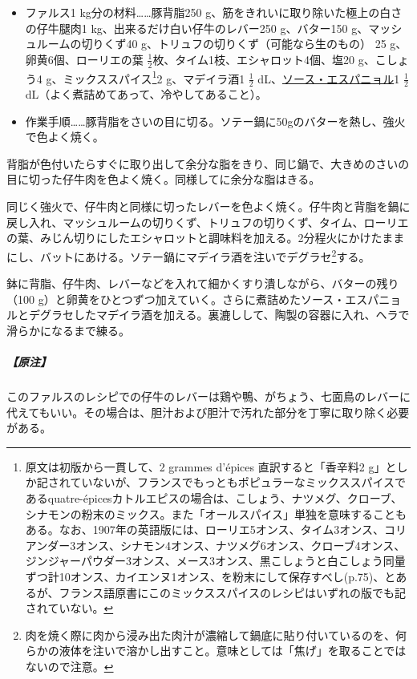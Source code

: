 \begin{recette}
\begin{itemize}
\item
  ファルス1 kg分の材料\ldots{}\ldots{}豚背脂250
  g、筋をきれいに取り除いた極上の白さの仔牛腿肉1
  kg、出来るだけ白い仔牛のレバー250 g、バター150
  g、マッシュルームの切りくず40
  g、トリュフの切りくず（可能なら生のもの） 25 g、卵黄6個、ローリエの葉
  \(\frac{1}{2}\)枚、タイム1枝、エシャロット4個、塩20 g、こしょう4
  g、ミックススパイス\footnote{原文は初版から一貫して、2 grammes
    d'épices 直訳すると「香辛料2
    g」としか記されていないが、フランスでもっともポピュラーなミックススパイスであるquatre-épicesカトルエピスの場合は、こしょう、ナツメグ、クローブ、シナモンの粉末のミックス。また「オールスパイス」単独を意味することもある。なお、1907年の英語版には、ローリエ5オンス、タイム3オンス、コリアンダー3オンス、シナモン4オンス、ナツメグ6オンス、クローブ4オンス、ジンジャーパウダー3オンス、メース3オンス、黒こしょうと白こしょう同量ずつ計10オンス、カイエンヌ1オンス、を粉末にして保存すべし(p.75)、とあるが、フランス語原書にこのミックススパイスのレシピはいずれの版でも記されていない。}2
  g、マデイラ酒1 \(\frac{1}{2}\)
  dL、\protect\hyperlink{sauce-espagnole}{ソース・エスパニョル}1
  \(\frac{1}{2}\) dL（よく煮詰めてあって、冷やしてあること）。
\item
  作業手順\ldots{}\ldots{}豚背脂をさいの目に切る。ソテー鍋に50gのバターを熱し、強火で色よく焼く。
\end{itemize}

背脂が色付いたらすぐに取り出して余分な脂をきり、同じ鍋で、大きめのさいの目に切った仔牛肉を色よく焼く。同様してに余分な脂はきる。

同じく強火で、仔牛肉と同様に切ったレバーを色よく焼く。仔牛肉と背脂を鍋に戻し入れ、マッシュルームの切りくず、トリュフの切りくず、タイム、ローリエの葉、みじん切りにしたエシャロットと調味料を加える。2分程火にかけたままにし、バットにあける。ソテー鍋にマデイラ酒を注いでデグラセ\footnote{肉を焼く際に肉から浸み出た肉汁が濃縮して鍋底に貼り付いているのを、何らかの液体を注いで溶かし出すこと。意味としては「焦げ」を取ることではないので注意。}する。

鉢に背脂、仔牛肉、レバーなどを入れて細かくすり潰しながら、バターの残り（100
g）と卵黄をひとつずつ加えていく。さらに煮詰めたソース・エスパニョルとデグラセしたマデイラ酒を加える。裏漉しして、陶製の容器に入れ、ヘラで滑らかになるまで練る。

\hypertarget{nota-farce-gratin-a}{%
\subparagraph{【原注】}\label{nota-farce-gratin-a}}

このファルスのレシピでの仔牛のレバーは鶏や鴨、がちょう、七面鳥のレバーに代えてもいい。その場合は、胆汁および胆汁で汚れた部分を丁寧に取り除く必要がある。


\end{recette}
